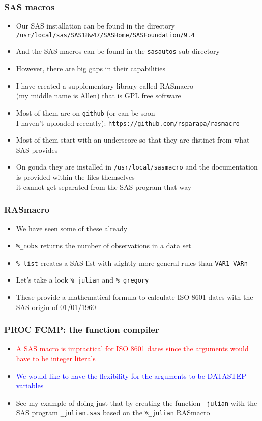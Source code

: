 \documentclass[11pt,pdftex,dvipsnames,usenames,helvetica]{beamer}
\begin{document}
\begin{frame}[fragile]
\frametitle{SAS macros}
\begin{itemize}
\item Our SAS installation can be found in the directory
{\tt /usr/local/sas/SAS18w47/SASHome/SASFoundation/9.4}
\item And the SAS macros can be found in the {\tt sasautos}
sub-directory
\item However, there are big gaps in their capabilities
\item I have created a supplementary library called RASmacro\\
(my middle name is Allen) that is GPL free software
\item Most of them are on {\tt github} (or can be soon\\
I haven't uploaded recently): {\tt https://github.com/rsparapa/rasmacro}
\item Most of them start with an underscore so that they are distinct
from what SAS provides
\item On gouda they are installed in {\tt /usr/local/sasmacro}
and the documentation is provided within the files themselves\\
it cannot get separated from the SAS program that way
\end{itemize}
\end{frame}

\begin{frame}[fragile]
\frametitle{RASmacro}
\begin{itemize}
\item We have seen some of these already
\item {\tt \%\_nobs} returns the number of observations in a data set
\item {\tt \%\_list} creates a SAS list with slightly more general rules
than {\tt VAR1-VARn}
\item Let's take a look {\tt \%\_julian} and {\tt \%\_gregory}
\item These provide a mathematical formula to calculate ISO 8601
dates with the SAS origin of 01/01/1960
\end{itemize}
\end{frame}

\begin{frame}[fragile]
\frametitle{PROC FCMP: the function compiler}
\begin{itemize}
\item \textcolor{red}{A SAS macro is impractical for ISO 8601 dates
    since the arguments would have to be integer literals}
\item \textcolor{blue}{We would like to have the flexibility for the
  arguments to be DATASTEP variables}
\item See my example of doing just that by creating the
function {\tt \_julian} with the SAS program {\tt \_julian.sas}
based on the {\tt \%\_julian} RASmacro
\end{itemize}
\end{frame}
\end{document}
